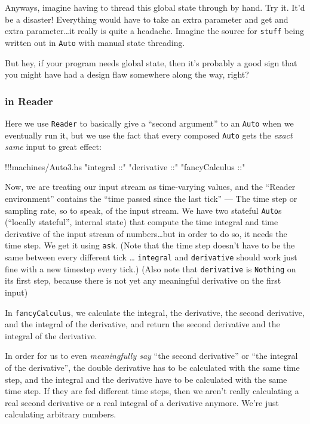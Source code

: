 \documentclass[]{article}
\newenvironment{Shaded}{}{}
\newcommand{\StringTok}[1]{\textcolor[rgb]{0.25,0.44,0.63}{{#1}}}
\newcommand{\FunctionTok}[1]{\textcolor[rgb]{0.02,0.16,0.49}{{#1}}}
\newcommand{\NormalTok}[1]{{#1}}
\begin{document}
Anyways, imagine having to thread this global state through by hand. Try
it. It'd be a disaster! Everything would have to take an extra parameter
and get and extra parameter\ldots{}it really is quite a headache.
Imagine the source for \texttt{stuff} being written out in \texttt{Auto}
with manual state threading.

But hey, if your program needs global state, then it's probably a good
sign that you might have had a design flaw somewhere along the way,
right?

\subsubsection{in Reader}\label{in-reader}

Here we use \texttt{Reader} to basically give a ``second argument'' to
an \texttt{Auto} when we eventually run it, but we use the fact that
every composed \texttt{Auto} gets the \emph{exact same} input to great
effect:

\begin{Shaded}
\begin{Highlighting}[]
\FunctionTok{!!!}\NormalTok{machines}\FunctionTok{/}\NormalTok{Auto3.hs }\StringTok{"integral ::"} \StringTok{"derivative ::"} \StringTok{"fancyCalculus ::"}
\end{Highlighting}
\end{Shaded}

Now, we are treating our input stream as time-varying values, and the
``Reader environment'' contains the ``time passed since the last tick''
--- The time step or sampling rate, so to speak, of the input stream. We
have two stateful \texttt{Auto}s (``locally stateful'', internal state)
that compute the time integral and time derivative of the input stream
of numbers\ldots{}but in order to do so, it needs the time step. We get
it using \texttt{ask}. (Note that the time step doesn't have to be the
same between every different tick \ldots{} \texttt{integral} and
\texttt{derivative} should work just fine with a new timestep every
tick.) (Also note that \texttt{derivative} is \texttt{Nothing} on its
first step, because there is not yet any meaningful derivative on the
first input)

In \texttt{fancyCalculus}, we calculate the integral, the derivative,
the second derivative, and the integral of the derivative, and return
the second derivative and the integral of the derivative.

In order for us to even \emph{meaningfully say} ``the second
derivative'' or ``the integral of the derivative'', the double
derivative has to be calculated with the same time step, and the
integral and the derivative have to be calculated with the same time
step. If they are fed different time steps, then we aren't really
calculating a real second derivative or a real integral of a derivative
anymore. We're just calculating arbitrary numbers.
\end{document}

